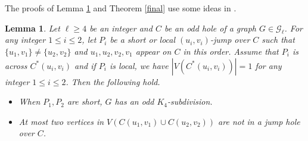 \documentclass[11pt]{article}
\newtheorem{lemma}[theorem]{Lemma}
\begin{document}
The proofs of Lemma \ref{uncrossing jumps} and Theorem \ref{final} use some ideas in \cite{MC22}.
\begin{lemma}\label{uncrossing jumps}
Let $\ell\geq4$ be an integer and $C$ be an odd hole of a graph $G\in \mathcal{G}_{\ell}$. For any integer $1\leq i\leq2$, let $P_i$ be a short or local $(u_i,v_i)$-jump over $C$ such that $\{u_1,v_1\}\neq \{u_2, v_2\}$ and $u_1,u_2, v_2,v_1$ appear on $C$ in this order. Assume that $P_i$ is across $C^*(u_i,v_i)$ and if $P_i$ is local, we have $|V(C^*(u_i,v_i))|=1$ for any integer $1\leq i\leq2$. Then the following hold.
\begin{itemize}
\item[(1)] When $P_1,P_2$ are short, $G$ has an odd $K_4$-subdivision.
\item[(2)] At most two vertices in $V(C(u_1,v_1)\cup C(u_2,v_2))$ are not in a jump hole over $C$.
\end{itemize}
\end{lemma}
\end{document}
